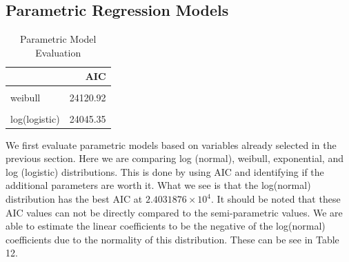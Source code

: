 \documentclass[
]{article}
\begin{document}
\subsection {Parametric Regression Models}

\begin{table}[!h]

\caption{\label{tab:unnamed-chunk-14}Parametric Model Evaluation}
\centering
\begin{tabular}[t]{lr}
\toprule
  & AIC\\
\midrule
\cellcolor{gray!6}{log(normal)} & \cellcolor{gray!6}{24031.88}\\
weibull & 24120.92\\
\cellcolor{gray!6}{exponential} & \cellcolor{gray!6}{24259.09}\\
log(logistic) & 24045.35\\
\bottomrule
\end{tabular}
\end{table}

We first evaluate parametric models based on variables already selected in the previous section. Here we are comparing log (normal), weibull, exponential, and log (logistic) distributions. This is done by using AIC and identifying if the additional parameters are worth it. What we see is that the log(normal) distribution has the best AIC at \ensuremath{2.4031876\times 10^{4}}. It should be noted that these AIC values can not be directly compared to the semi-parametric values. We are able to estimate the linear coefficients to be the negative of the log(normal) coefficients due to the normality of this distribution. These can be see in Table 12.
\end{document}
